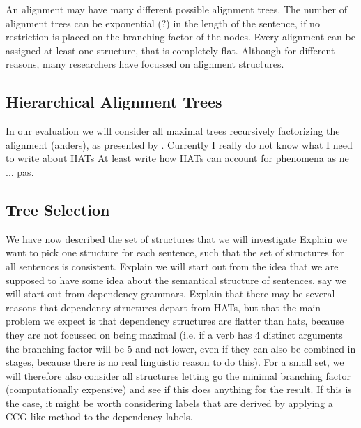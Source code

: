 \documentclass{report}
\theoremstyle{definition}
\theoremstyle{plain}
\begin{document}
An alignment may have many different possible alignment trees. The number of alignment trees can be exponential (?) in the length of the sentence, if no restriction is placed on the branching factor of the nodes. Every alignment can be assigned at least one structure, that is completely flat.
Although for different reasons, many researchers have focussed on alignment structures.



\subsection{Hierarchical Alignment Trees}

In our evaluation we will consider all maximal trees recursively factorizing the alignment (anders), as presented by \cite{simaan2013hats2}.
Currently I really do not know what I need to write about HATs
At least write how HATs can account for phenomena as ne ... pas.


\subsection{Tree Selection}

We have now described the set of structures that we will investigate
Explain we want to pick one structure for each sentence, such that the set of structures for all sentences is consistent. 
Explain we will start out from the idea that we are supposed to have some idea about the semantical structure of sentences, say we will start out from dependency grammars. \citep{schubert1987metataxis}
Explain that there may be several reasons that dependency structures depart from HATs, but that the main problem we expect is that dependency structures are flatter than hats, because they are not focussed on being maximal (i.e. if a verb has 4 distinct arguments the branching factor will be 5 and not lower, even if they can also be combined in stages, because there is no real linguistic reason to do this). For a small set, we will therefore also consider all structures letting go the minimal branching factor (computationally expensive) and see if this does anything for the result. If this is the case, it might be worth considering labels that are derived by applying a CCG like method to the dependency labels.
\end{document}
